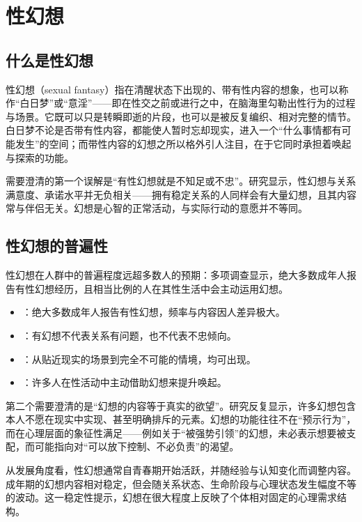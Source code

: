 \section{性幻想}
\subsection{什么是性幻想}

性幻想（sexual fantasy）指在清醒状态下出现的、带有性内容的想象，也可以称作“白日梦”或“意淫”——即在性交之前或进行之中，在脑海里勾勒出性行为的过程与场景。它既可以只是转瞬即逝的片段，也可以是被反复编织、相对完整的情节。白日梦不论是否带有性内容，都能使人暂时忘却现实，进入一个“什么事情都有可能发生”的空间；而带性内容的幻想之所以格外引人注目，在于它同时承担着唤起与探索的功能。

需要澄清的第一个误解是“有性幻想就是不知足或不忠”。研究显示，性幻想与关系满意度、承诺水平并无负相关——拥有稳定关系的人同样会有大量幻想，且其内容常与伴侣无关。幻想是心智的正常活动，与实际行动的意愿并不等同。

\subsection{性幻想的普遍性}

性幻想在人群中的普遍程度远超多数人的预期：多项调查显示，绝大多数成年人报告有性幻想经历，且相当比例的人在其性生活中会主动运用幻想。

\begin{itemize}
  \item {}：绝大多数成年人报告有性幻想，频率与内容因人差异极大。
  \item {}：有幻想不代表关系有问题，也不代表不忠倾向。
  \item {}：从贴近现实的场景到完全不可能的情境，均可出现。
  \item {}：许多人在性活动中主动借助幻想来提升唤起。
\end{itemize}

第二个需要澄清的是“幻想的内容等于真实的欲望”。研究反复显示，许多幻想包含本人不愿在现实中实现、甚至明确排斥的元素。幻想的功能往往不在“预示行为”，而在心理层面的象征性满足——例如关于“被强势引领”的幻想，未必表示想要被支配，而可能指向对“可以放下控制、不必负责”的渴望。

从发展角度看，性幻想通常自青春期开始活跃，并随经验与认知变化而调整内容。成年期的幻想内容相对稳定，但会随关系状态、生命阶段与心理状态发生幅度不等的波动。这一稳定性提示，幻想在很大程度上反映了个体相对固定的心理需求结构。

